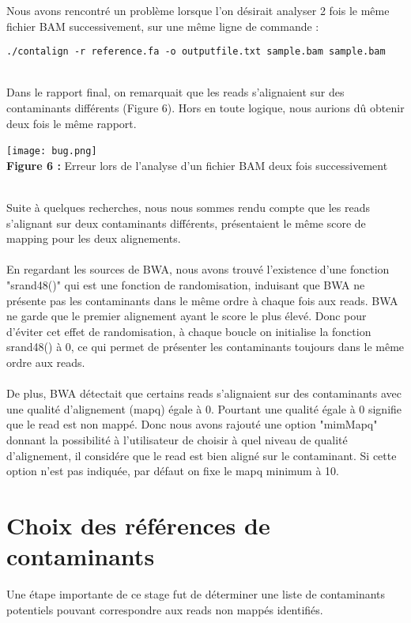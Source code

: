 \documentclass[a4paper,12pt]{article}
\begin{document}
Nous avons rencontré un problème lorsque l'on désirait analyser 2 fois le même fichier BAM successivement, sur une même ligne de commande :
\begin{lstlisting}
./contalign -r reference.fa -o outputfile.txt sample.bam sample.bam 
\end{lstlisting} 
 ~\\
 Dans le rapport final, on remarquait que les reads s'alignaient sur des contaminants différents (Figure 6). Hors en toute logique, nous aurions dû obtenir deux fois le même rapport.
\begin{center}
 \texttt{[image: bug.png]}~\\
 \textbf{Figure 6 :} Erreur lors de l'analyse d'un fichier BAM deux fois successivement
 \end{center}
 ~\\
Suite à quelques recherches, nous nous sommes rendu compte que les reads s'alignant sur deux contaminants différents, présentaient le même score de mapping pour les deux alignements.\\
~\\
En regardant les sources de BWA, nous avons trouvé l'existence d'une fonction "srand48()" qui est une fonction de randomisation,  induisant que BWA ne présente pas les contaminants dans le même ordre à chaque fois aux reads. BWA ne garde que le premier alignement ayant le score le plus élevé. Donc pour d'éviter cet effet de randomisation, à chaque boucle on initialise la fonction srand48() à 0, ce qui permet de présenter les contaminants toujours dans le même ordre aux reads. \\
~\\

De plus, BWA détectait que certains reads s'alignaient sur des contaminants avec une qualité d'alignement (mapq) égale à 0. Pourtant une qualité égale à 0 signifie que le read est non mappé. Donc nous avons rajouté une option "mimMapq" donnant la possibilité à l'utilisateur de choisir à quel niveau de qualité d'alignement, il considére que le read est bien aligné sur le contaminant. Si cette option n'est pas indiquée, par défaut on fixe le mapq minimum à 10.
 
\clearpage


\section{Choix des références de contaminants}

Une étape importante de ce stage fut de déterminer une liste de contaminants potentiels pouvant correspondre aux reads non mappés identifiés.\\ 
\end{document}
